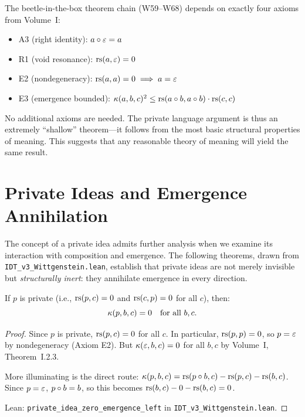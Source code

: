 \begin{remark}
The beetle-in-the-box theorem chain (W59--W68) depends on exactly four axioms
from Volume~I:
\begin{itemize}
\item A3 (right identity): $a \circ \varepsilon = a$
\item R1 (void resonance): $\mathrm{rs}(a, \varepsilon) = 0$
\item E2 (nondegeneracy): $\mathrm{rs}(a, a) = 0 \implies a = \varepsilon$
\item E3 (emergence bounded): $\kappa(a,b,c)^2 \leq \mathrm{rs}(a \circ b, a \circ b) \cdot \mathrm{rs}(c,c)$
\end{itemize}
No additional axioms are needed. The private language argument is thus an
extremely ``shallow'' theorem---it follows from the most basic structural
properties of meaning. This suggests that any reasonable theory of meaning
will yield the same result.
\end{remark}

\section{Private Ideas and Emergence Annihilation}

The concept of a private idea admits further analysis when we examine its
interaction with composition and emergence. The following theorems, drawn from
\texttt{IDT\_v3\_Wittgenstein.lean}, establish that private ideas are not merely
invisible but \emph{structurally inert}: they annihilate emergence in every
direction.

\begin{theorem}
\label{thm:private-kills-emergence}
If $p$ is private (i.e., $\mathrm{rs}(p, c) = 0$ and $\mathrm{rs}(c, p) = 0$ for all $c$),
then:
\[
\kappa(p, b, c) = 0 \quad \text{for all } b, c.
\]
\end{theorem}

\begin{proof}
Since $p$ is private, $\mathrm{rs}(p, c) = 0$ for all $c$. In particular, $\mathrm{rs}(p, p) = 0$,
so $p = \varepsilon$ by nondegeneracy (Axiom E2). But $\kappa(\varepsilon, b, c) = 0$ for
all $b, c$ by Volume~I, Theorem~I.2.3.

More illuminating is the direct route: $\kappa(p, b, c) = \mathrm{rs}(p \circ b, c)
- \mathrm{rs}(p, c) - \mathrm{rs}(b, c)$. Since $p = \varepsilon$, $p \circ b = b$, so this becomes
$\mathrm{rs}(b, c) - 0 - \mathrm{rs}(b, c) = 0$.

Lean: \texttt{private\_idea\_zero\_emergence\_left} in
\texttt{IDT\_v3\_Wittgenstein.lean}.
\end{proof}

